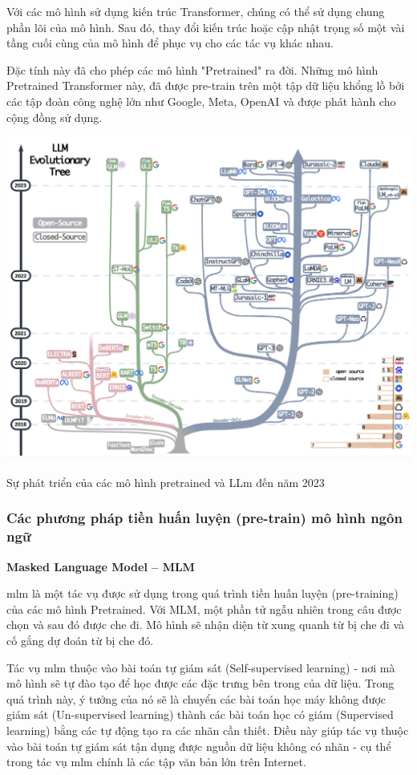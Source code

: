 \documentclass[a4paper, 12pt, openany]{book}
\begin{document}
Với các mô hình sử dụng kiến trúc Transformer, chúng có thể sử dụng chung phần lõi của mô hình.
Sau đó, thay đổi kiến trúc hoặc cập nhật trọng số một vài tầng cuối cùng của mô hình để phục vụ cho các tác vụ khác nhau.

Đặc tính này đã cho phép các mô hình "Pretrained" ra đời. Những mô hình Pretrained Transformer này, đã được pre-train
trên một tập dữ liệu khổng lồ bởi các tập đoàn công nghệ lớn như Google, Meta, OpenAI và
được phát hành cho cộng đồng sử dụng.


\begin{minipage}{\linewidth}
    \captionsetup{type=figure}
    \centering
    \includegraphics[width=.6\linewidth]{./assets/images/LLM-Evolutionary-Tree.png}
    \caption{Sự phát triển của các mô hình pretrained và LLm đến năm 2023\cite{llm-trends}}
\end{minipage}

\subsubsection{Các phương pháp tiền huấn luyện (pre-train) mô hình ngôn ngữ}

\textbf{Masked Language Model – MLM}

\ac{mlm} là một tác vụ được sử dụng trong quá trình
tiền huấn luyện (pre-training) của các mô hình Pretrained. Với MLM, một phần tử ngẫu nhiên trong câu
được chọn và sau đó được che đi. Mô hình sẽ nhận diện từ xung quanh từ bị che đi và cố
gắng dự đoán từ bị che đó.

Tác vụ \ac{mlm} thuộc vào bài toán tự giám sát (Self-supervised learning) - nơi mà mô hình sẽ tự đào tạo để học được
các đặc trưng bên trong của dữ liệu. Trong quá trình này, ý tưởng của nó sẽ là chuyển các bài toán học máy không được giám sát (Un-supervised learning)
thành các bài toán học có giám (Supervised learning) bằng các tự động tạo ra các nhãn cần thiết.
Điều này giúp tác vụ thuộc vào bài toán tự giám sát tận dụng được nguồn dữ liệu không có nhãn - cụ thể trong tác vụ
\ac{mlm} chính là các tập văn bản lớn trên Internet.
\end{document}
